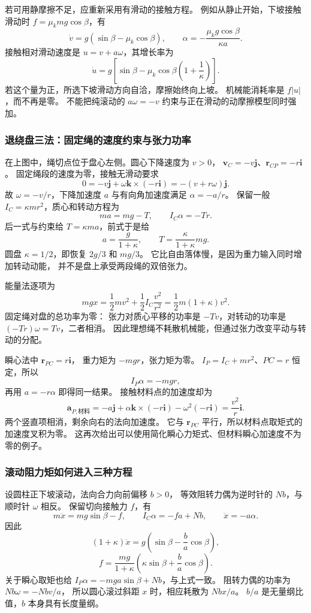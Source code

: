 \documentclass[UTF8,zihao=-4,fontset=fandol,a4paper]{ctexart}
\newcommand{\vect}[1]{\bm{#1}}
\begin{document}
若可用静摩擦不足，应重新采用有滑动的接触方程。
例如从静止开始，下坡接触滑动时 $f=\mu_kmg\cos\beta$，有
\[
\dot v=g(\sin\beta-\mu_k\cos\beta),\qquad
\alpha=-\frac{\mu_kg\cos\beta}{\kappa a}.
\]
接触相对滑动速度是 $u=v+a\omega$，其增长率为
\[
\dot u=g\left[\sin\beta-\mu_k\cos\beta
\left(1+\frac1\kappa\right)\right].
\]
若这个量为正，所选下坡滑动方向自洽，摩擦始终向上坡。
机械能消耗率是 $f|u|$，而不再是零。
不能把纯滚动的 $a\omega=-v$ 约束与正在滑动的动摩擦模型同时强加。

\subsubsection*{退绕盘三法：固定绳的速度约束与张力功率}
在上图中，绳切点位于盘心左侧。圆心下降速度为 $v>0$，
$\vect v_C=-v\vect j$、$\vect r_{CP}=-r\vect i$。
固定绳段的速度为零，接触无滑动要求
\[
0=-v\vect j+\omega\vect k\times(-r\vect i)
=-(v+r\omega)\vect j.
\]
故 $\omega=-v/r$，下降加速度 $a$ 与有向角加速度满足 $\alpha=-a/r$。
保留一般 $I_C=\kappa mr^2$，质心和转动方程为
\[
ma=mg-T,\qquad I_C\alpha=-Tr.
\]
后一式与约束给 $T=\kappa ma$，前式于是给
\[
a=\frac{g}{1+\kappa},\qquad
T=\frac{\kappa}{1+\kappa}mg.
\]
圆盘 $\kappa=1/2$，即恢复 $2g/3$ 和 $mg/3$。
它比自由落体慢，是因为重力输入同时增加转动动能，
并不是盘上承受两段绳的双倍张力。

能量法逐项为
\[
mgx=\frac12mv^2+\frac12I_C\frac{v^2}{r^2}
=\frac12m(1+\kappa)v^2.
\]
固定绳对盘的总功率为零：
张力对质心平移的功率是 $-Tv$，对转动的功率是
$(-Tr)\omega=Tv$，二者相消。
因此理想绳不耗散机械能，但通过张力改变平动与转动的分配。

瞬心法中 $\vect r_{PC}=r\vect i$，
重力矩为 $-mgr$，张力矩为零。
$I_P=I_C+mr^2$、$PC=r$ 恒定，所以
\[
I_P\alpha=-mgr,
\]
再用 $a=-r\alpha$ 即得同一结果。
接触材料点的加速度却为
\[
\vect a_{P,\text{材料}}=
-a\vect j+\alpha\vect k\times(-r\vect i)-\omega^2(-r\vect i)
=\frac{v^2}{r}\vect i.
\]
两个竖直项相消，剩余向右的法向加速度。
它与 $\vect r_{PC}$ 平行，所以材料点取矩式的加速度叉积为零。
这再次给出可以使用简化瞬心力矩式、但材料瞬心加速度不为零的例子。

\subsubsection*{滚动阻力矩如何进入三种方程}
设圆柱正下坡滚动，法向合力向前偏移 $b>0$，
等效阻转力偶为逆时针的 $Nb$，与顺时针 $\omega$ 相反。
保留切向接触力 $f$，有
\[
m\ddot x=mg\sin\beta-f,\qquad
I_C\alpha=-fa+Nb,\qquad \ddot x=-a\alpha.
\]
因此
\[
(1+\kappa)\ddot x=g\left(\sin\beta-\frac ba\cos\beta\right),
\]
\[
f=\frac{mg}{1+\kappa}
\left(\kappa\sin\beta+\frac ba\cos\beta\right).
\]
关于瞬心取矩也给
$I_P\alpha=-mga\sin\beta+Nb$，与上式一致。
阻转力偶的功率为 $Nb\omega=-Nbv/a$，
所以圆心滚过斜距 $x$ 时，相应耗散为 $Nbx/a$。
$b/a$ 是无量纲比值，$b$ 本身具有长度量纲。
\end{document}

